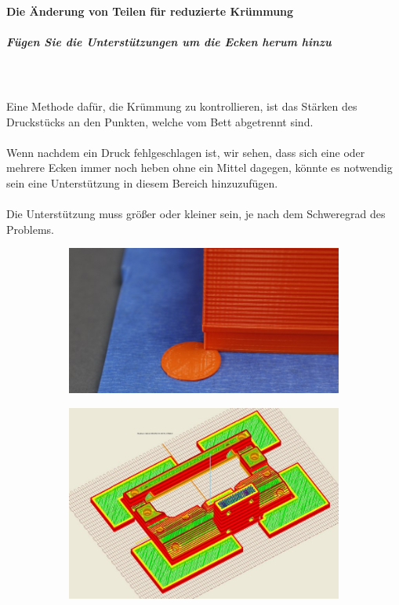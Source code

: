 \documentclass[11pt,a4paper]{article}
\begin{document}
			\paragraph{Die Änderung von Teilen für reduzierte Krümmung}
				\subparagraph{Fügen Sie die Unterstützungen um die Ecken herum hinzu}\mbox{}\\\\
Eine Methode dafür, die Krümmung zu kontrollieren, ist das Stärken des Druckstücks an den Punkten, welche vom Bett abgetrennt sind.
\\\\
Wenn nachdem ein Druck fehlgeschlagen ist, wir sehen, dass sich eine oder mehrere Ecken immer noch heben ohne ein Mittel dagegen, könnte es notwendig sein eine Unterstützung in diesem Bereich hinzuzufügen.
\\\\
Die Unterstützung muss größer oder kleiner sein, je nach dem Schweregrad des Problems.
\begin{figure}[H]
    \centering
    \begin{subfigure}[b]{0.4\textwidth}
        \includegraphics[width=\textwidth,cfbox=azul_marcos 4pt 0pt]{FOTOS/MOUSEEAR1}
    \end{subfigure}
    \qquad %
    \begin{subfigure}[b]{0.4\textwidth}
        \includegraphics[width=\textwidth,cfbox=azul_marcos 4pt 0pt]{FOTOS/MOUSEEAR2}
    \end{subfigure}   
\end{figure}	
\end{document}
